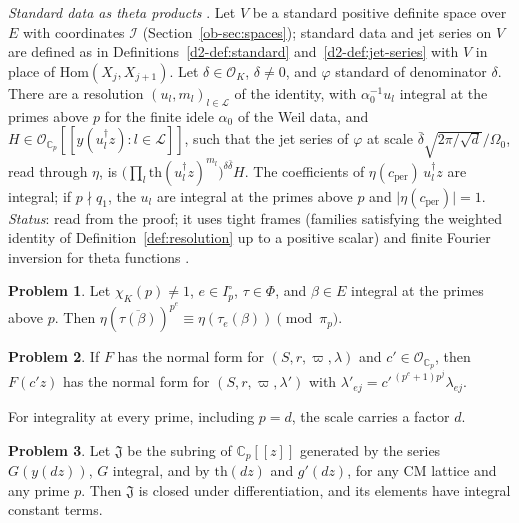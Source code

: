 \documentclass[reqno]{amsart}
\theoremstyle{plain}
\theoremstyle{definition}
\newtheorem{problem}{Problem}[section]
\theoremstyle{remark}
\newcommand{\C}{\mathbb{C}}
\newcommand{\Oc}{\mathcal{O}}
\newcommand{\Op}{\mathcal{O}_{\C_p}}
\newcommand{\tth}{\mathrm{th}}
\newcommand{\cper}{c_{\mathrm{per}}}
\begin{document}
\emph{Standard data as theta products} \cite{GL}.  Let \(V\) be a standard positive definite space over \(E\) with coordinates \(\mathcal I\) (Section~\ref{ob-sec:spaces}); standard data and jet series on \(V\) are defined as in Definitions~\ref{d2-def:standard} and~\ref{d2-def:jet-series} with \(V\) in place of \(\mathrm{Hom}(X_j, X_{j+1})\).  Let \(\delta \in \Oc_K\), \(\delta \ne 0\), and \(\varphi\) standard of denominator \(\delta\).  There are a resolution \((u_l, m_l)_{l \in \mathcal L}\) of the identity, with \(\alpha_0^{-1}u_l\) integral at the primes above \(p\) for the finite idele \(\alpha_0\) of the Weil data, and \(H \in \Op[[y(u_l^\dagger z) : l \in \mathcal L]]\), such that the jet series of \(\varphi\) at scale \(\bar\delta\sqrt{2\pi/\sqrt d}/\Omega_0\), read through \(\eta\), is \(\bigl(\prod_l \tth(u_l^\dagger z)^{m_l}\bigr)^{\delta\bar\delta} H\).  The coefficients of \(\eta(\cper)\, u_l^\dagger z\) are integral; if \(p \nmid q_1\), the \(u_l\) are integral at the primes above \(p\) and \(\lvert\eta(\cper)\rvert = 1\).  \emph{Status}: read from the proof; it uses tight frames (families satisfying the weighted identity of Definition~\ref{def:resolution} up to a positive scalar) and finite Fourier inversion for theta functions \cite{Mu}.

\begin{problem}\label{pr:partner}
Let \(\chi_K(p) \ne 1\), \(e \in I_p^\circ\), \(\tau \in \Phi\), and \(\beta \in E\) integral at the primes above \(p\).  Then \(\eta(\overline{\tau(\beta)})^{p^e} \equiv \eta(\tau_e(\beta)) \pmod{\pi_p}\).
\end{problem}

\begin{problem}\label{pr:rescale}
If \(F\) has the normal form for \((S, r, \varpi, \lambda)\) and \(c' \in \Op\), then \(F(c' z)\) has the normal form for \((S, r, \varpi, \lambda')\) with \(\lambda'_{ej} = c'^{\,(p^e+1)p^j}\lambda_{ej}\).
\end{problem}

For integrality at every prime, including \(p = d\), the scale carries a factor \(d\).

\begin{problem}\label{pr:jet-ring}
Let \(\mathfrak J\) be the subring of \(\C_p[[z]]\) generated by the series \(G(y(dz))\), \(G\) integral, and by \(\tth(dz)\) and \(g'(dz)\), for any CM lattice and any prime \(p\).  Then \(\mathfrak J\) is closed under differentiation, and its elements have integral constant terms.
\end{problem}
\end{document}
